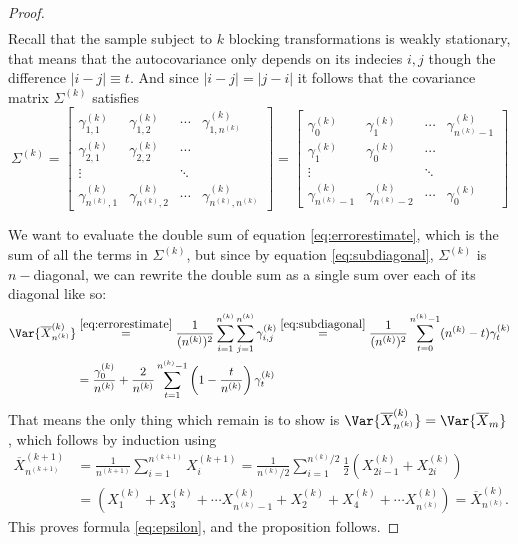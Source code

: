 \documentclass[11pt,english,a4paper]{article}
\begin{document}
\begin{proof}
\begin{align}
\end{align}
Recall that the sample subject to $k$ blocking transformations is weakly stationary, that means that the autocovariance only depends on its indecies $i,j$ though the difference $|i-j| \equiv t$. And since $|i-j| = |j-i|$ it follows that the covariance matrix $\Sigma^{(k)}$ satisfies
\begin{equation}
\Sigma^{(k)} = \begin{bmatrix}
\gamma^{(k)}_{1,1} & \gamma^{(k)}_{1,2} & \cdots & \gamma^{(k)}_{1,n^{(k)}} \\
\gamma^{(k)}_{2,1} & \gamma^{(k)}_{2,2} & \cdots &  \\
\vdots & & \ddots \\
\gamma^{(k)}_{n^{(k)},1} & \gamma^{(k)}_{n^{(k)},2} & \cdots & \gamma^{(k)}_{n^{(k)},n^{(k)}}
\end{bmatrix} = 
\begin{bmatrix}
\gamma^{(k)}_{0} & \gamma^{(k)}_{1} & \cdots & \gamma^{(k)}_{n^{(k)}-1} \\
\gamma^{(k)}_{1} & \gamma^{(k)}_{0} & \cdots &  \\
\vdots & & \ddots \\
\gamma^{(k)}_{n^{(k)}-1} & \gamma^{(k)}_{n^{(k)}-2} & \cdots & \gamma^{(k)}_{0}
\end{bmatrix} \label{eq:subdiagonal}
\end{equation}

We want to evaluate the double sum of equation \eqref{eq:errorestimate}, which is the 
sum of all the terms in $\Sigma^{(k)}$, but since by equation \eqref{eq:subdiagonal}, $\Sigma^{(k)}$ is $n-$diagonal, we can rewrite the double sum as a single sum over each of its diagonal like so:
\begin{align*}
\Var{\overline{X}^{(k)}_{n^{(k)}}} &\stackrel{\eqref{eq:errorestimate} }{=} \frac{1}{(n^{(k)})^2} \sum_{i=1}^{n^{(k)}} \sum_{j=1}^{n^{(k)}} \gamma_{i,j}^{(k)}  \stackrel{\eqref{eq:subdiagonal} }{=} \frac{1}{(n^{(k)})^2} \sum_{t=0}^{n^{(k)} - 1}  (n^{(k)} - t) \gamma_{t}^{(k)} \\
&= \frac{\gamma_0^{(k)}}{n^{(k)}} + \frac{2}{n^{(k)}} \sum_{t=1}^{n^{(k)} - 1} \left( 1 - \frac{t}{n^{(k)}} \right)\gamma^{(k)}_t
\end{align*}
That means the only thing which remain is to show is $\Var{\overline{X}^{(k)}_{n^{(k)}}} = \Var{\overline{X}_{m}}$, which follows by induction using
\begin{align*}
\overline{X}^{(k+1)}_{n^{(k+1)}} &= \frac{1}{n^{(k+1)}} \sum_{i=1}^{n^{(k+1)}}X_i^{(k+1)} = \frac{1}{n^{(k)}/2} \sum_{i=1}^{n^{(k)}/2} \frac{1}{2} \left( X^{(k)}_{2i-1} + X^{(k)}_{2i} \right) \\
&= \left( X_1^{(k)} + X_3^{(k)} + \cdots X_{n^{(k)} - 1}^{(k)} + X_2^{(k)} + X_4^{(k)} + \cdots X_{n^{(k)}}^{(k)} \right) = \overline{X}^{(k)}_{n^{(k)}}.
\end{align*}
This proves formula \eqref{eq:epsilon}, and the proposition follows.
\end{proof}

\printbibliography
\end{document}
